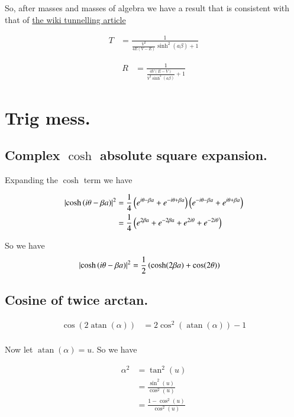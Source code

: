 \documentclass{article}
\DeclareMathOperator{\atan}{atan}
\begin{document}
So, after masses and masses of algebra we have a result that is consistent with that of
\href{http://en.wikipedia.org/wiki/Potential_barrier}{the wiki tunnelling article}

\begin{align}
T 
&= \frac{1} { \frac{V^2}{4E(V-E)} \sinh^2(a \beta) + 1 }
\end{align}

\begin{align}
R 
&= \frac{1} { \frac{4V(E-V)}{V^2 \sinh^2(a \beta)} + 1 }
\end{align}


\section{ Trig mess. }

\subsection{ Complex $\cosh$ absolute square expansion. }

Expanding the $\cosh$ term we have

\begin{align*}
\left\lvert{\cosh\left( i\theta -\beta a \right)}\right\rvert^2
&=
\frac{1}{4}
\left(
e^{i\theta - \beta a}
+ e^{-i\theta + \beta a}
\right)
\left(
e^{-i\theta - \beta a}
+ e^{i\theta + \beta a}
\right) \\
&=
\frac{1}{4}\left(
e^{2\beta a}
+ e^{-2\beta a}
+e^{2i\theta }
+e^{-2i\theta }
\right) \\
\end{align*}

So we have
\begin{align}\label{eqn:coshSquared}
\left\lvert{\cosh\left( i\theta -\beta a \right)}\right\rvert^2
&=\frac{1}{2}
\left( \cosh(2\beta a) + \cos(2\theta) \right)
\end{align}

\subsection{ Cosine of twice arctan. }

\begin{align*}
\cos(2\atan(\alpha)) 
&= 
2 \cos^2\left( \atan(\alpha) \right) -1 \\
\end{align*}

Now let $\atan(\alpha) = u$.  So we have

\begin{align*}
\alpha^2 
&=
\tan^2(u)  \\
&=
\frac{\sin^2(u)}{\cos^2(u)} \\
&=
\frac{1 -\cos^2(u)}{\cos^2(u)} \\
\end{align*}
\end{document}
